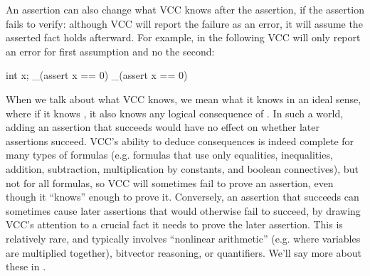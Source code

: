 An assertion can also change what VCC knows after the assertion, if
the assertion fails to verify: although VCC will report the failure as an error,
it will assume the asserted fact holds afterward. For example, in the following
VCC will only report an error for first assumption and no the second:
\begin{VCC}
int x;
_(assert x == 0)
_(assert x == 0)
\end{VCC}

When we talk about what VCC knows, we mean what it knows in an ideal
sense, where if it knows , it also knows any logical
consequence of . In such a world, adding an assertion that
succeeds would have no effect on whether later assertions succeed.
VCC's ability to deduce consequences is indeed complete for many types
of formulas (e.g. formulas that use only equalities,
inequalities, addition, subtraction, multiplication by constants, and
boolean connectives), but not for all formulas, so VCC will
sometimes fail to prove an assertion, even though it ``knows'' enough
to prove it.  Conversely, an assertion that succeeds can sometimes cause later assertions that
would otherwise fail to succeed, by drawing VCC's attention to a
crucial fact it needs to prove the later assertion.  This is
relatively rare, and typically involves ``nonlinear arithmetic''
(e.g. where variables are multiplied together), bitvector reasoning,
or quantifiers. We'll say more about these in .

